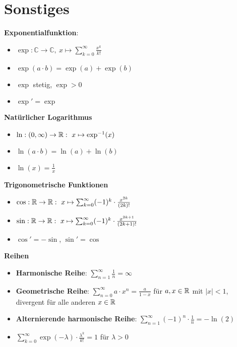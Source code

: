 \section{Sonstiges}


\textbf{Exponentialfunktion}:
\begin{itemize}
\item $\exp:\mathbb{C}\to\mathbb{C},\ x\mapsto\sum_{k=0}^\infty \frac{x^k}{k!}$

\item $\exp(a\cdot b)=\exp(a)+\exp(b)$

\item $\exp$ stetig, $\exp>0$

\item $\exp'=\exp$
\end{itemize}

\textbf{Natürlicher Logarithmus}
\begin{itemize}
\item $\ln: (0,\infty)\to\R:\ x\mapsto\exp^{-1}(x)$

\item $\ln(a\cdot b)=\ln(a)+\ln(b)$

\item $\ln(x)=\frac{1}{x}$
\end{itemize}

\textbf{Trigonometrische Funktionen}
\begin{itemize}
\item $\cos:\R\to\R:\ x\mapsto\sum_{k=0}^\infty (-1)^k\cdot\frac{x^{2k}}{(2k)!}$

\item $\sin:\R\to\R:\ x\mapsto\sum_{k=0}^\infty (-1)^k\cdot\frac{x^{2k+1}}{(2k+1)!}$

\item $\cos' = -\sin$, $\sin' = \cos$
\end{itemize}

\textbf{Reihen}
\begin{itemize}
\item \textbf{Harmonische Reihe}: $\sum_{n=1}^\infty \frac{1}{n}=\infty$

\item \textbf{Geometrische Reihe}: $\sum_{n=0}^\infty a\cdot x^n = \frac{a}{1-x}$
für $a,x\in\mathbb{R}$ mit $|x|<1$, divergent für alle anderen $x\in\mathbb{R}$

\item \textbf{Alternierende harmonische Reihe}:
$\sum_{n=1}^\infty (-1)^n\cdot\frac{1}{n}=-\ln(2)$

\item $\sum_{k=0}^\infty\exp(-\lambda)\cdot\frac{\lambda^k}{k!}=1$ für $\lambda>0$
\end{itemize}